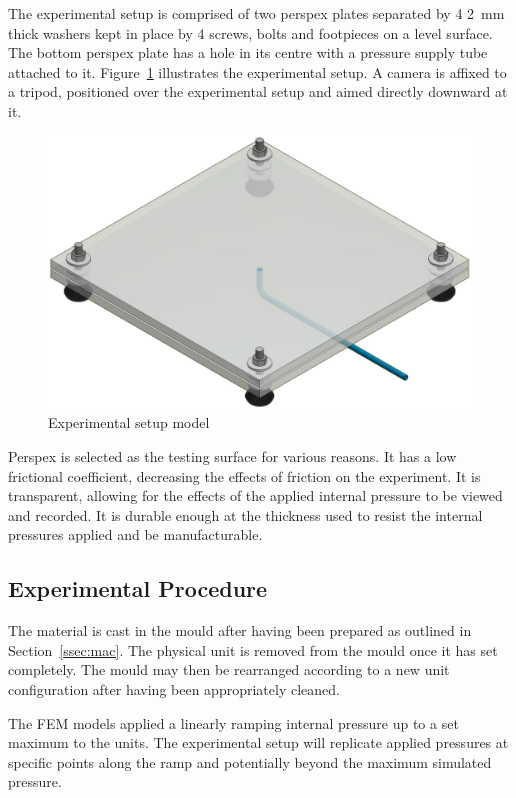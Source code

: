 The experimental setup is comprised of two perspex plates separated by 4 \SI{2}{mm} thick washers kept in place by 4 screws, bolts and footpieces on a level surface. The bottom perspex plate has a hole in its centre with a pressure supply tube attached to it. Figure~\ref{fig:exp} illustrates the experimental setup. A camera is affixed to a tripod, positioned over the experimental setup and aimed directly downward at it.

\begin{figure}[H]
	\centering
	\includegraphics[width=\textwidth]{ER.png}
	\caption{Experimental setup model}
	\label{fig:exp}
\end{figure}

Perspex is selected as the testing surface for various reasons. It has a low frictional coefficient, decreasing the effects of friction on the experiment. It is transparent, allowing for the effects of the applied internal pressure to be viewed and recorded. It is durable enough at the thickness used to resist the internal pressures applied and be manufacturable.

\subsection{Experimental Procedure}

The material is cast in the mould after having been prepared as outlined in Section~\ref{ssec:mac}. The physical unit is removed from the mould once it has set completely. The mould may then be rearranged according to a new unit configuration after having been appropriately cleaned.

The FEM models applied a linearly ramping internal pressure up to a set maximum to the units. The experimental setup will replicate applied pressures at specific points along the ramp and potentially beyond the maximum simulated pressure.

